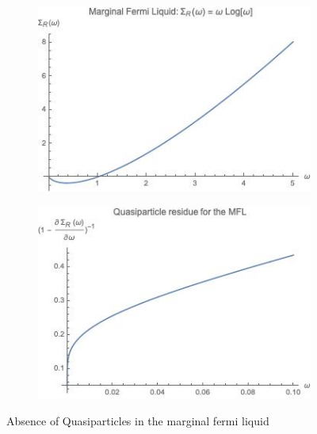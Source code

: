\begin{figure}
    \centering
    \begin{subfigure}[b]{0.4\textwidth}
    \centering
    \includegraphics[width = \textwidth]{figures/introduction/MFLS.jpeg}
    \end{subfigure}
    \begin{subfigure}[b]{0.4\textwidth}
    \centering
    \includegraphics[width = \textwidth]{figures/introduction/MFLZ.jpeg}
    \end{subfigure}
    \caption{Absence of Quasiparticles in the marginal fermi liquid}
    \label{fig:MFLZ}
\end{figure}

